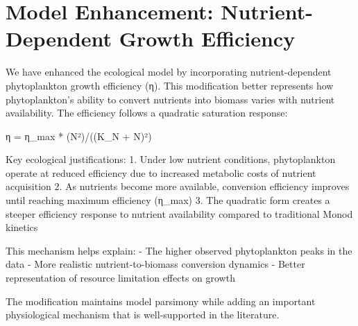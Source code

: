 \section{Model Enhancement: Nutrient-Dependent Growth Efficiency}

We have enhanced the ecological model by incorporating nutrient-dependent phytoplankton growth efficiency (η). This modification better represents how phytoplankton's ability to convert nutrients into biomass varies with nutrient availability. The efficiency follows a quadratic saturation response:

η = η_max * (N²)/((K_N + N)²)

Key ecological justifications:
1. Under low nutrient conditions, phytoplankton operate at reduced efficiency due to increased metabolic costs of nutrient acquisition
2. As nutrients become more available, conversion efficiency improves until reaching maximum efficiency (η_max)
3. The quadratic form creates a steeper efficiency response to nutrient availability compared to traditional Monod kinetics

This mechanism helps explain:
- The higher observed phytoplankton peaks in the data
- More realistic nutrient-to-biomass conversion dynamics
- Better representation of resource limitation effects on growth

The modification maintains model parsimony while adding an important physiological mechanism that is well-supported in the literature.
